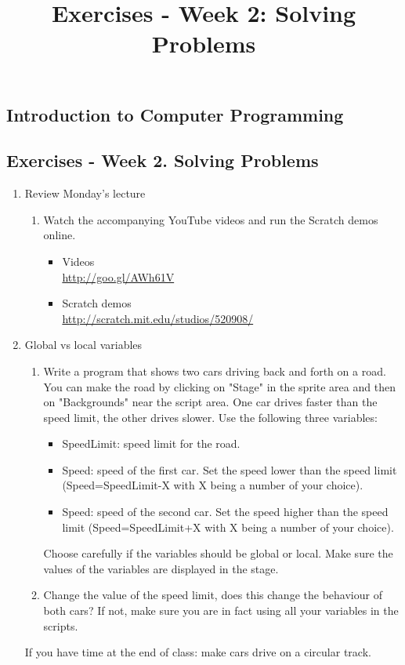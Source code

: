 \documentclass[12pt]{report}
\begin{document}
\title{Exercises - Week 2: Solving Problems}
\subsection*{Introduction to Computer Programming}
\subsection*{Exercises - Week 2. Solving Problems}
\begin{enumerate}
\item Review Monday's lecture
\begin{enumerate}
\item Watch the accompanying YouTube videos and run the Scratch demos online.
\begin{itemize}
\item Videos\\
\url{http://goo.gl/AWh61V}
\item Scratch demos\\
\url{http://scratch.mit.edu/studios/520908/}
\end{itemize}
\end{enumerate}
\item Global vs local variables
\begin{enumerate}
\item Write a program that shows two cars driving back and forth on a road. You can make the road by clicking on "Stage" in the sprite area and then on "Backgrounds" near the script area. One car drives faster than the speed limit, the other drives slower. Use the following three variables:
\begin{itemize}
\item SpeedLimit: speed limit for the road.
\item Speed: speed of the first car. Set the speed lower than the speed limit (Speed=SpeedLimit-X with X being a number of your choice).
\item Speed: speed of the second car. Set the speed higher than the speed limit (Speed=SpeedLimit+X with X being a number of your choice).
\end{itemize}
Choose carefully if the variables should be global or local. Make sure the values of the variables are displayed in the stage.
\item Change the value of the speed limit, does this change the behaviour of both cars? If not, make sure you are in fact using all your variables in the scripts.
\end{enumerate}
If you have time at the end of class: make cars drive on a circular track.


\end{enumerate}
\end{document}
